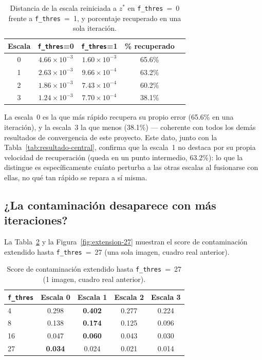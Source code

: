 \documentclass[11pt,a4paper]{article}
\newcommand{\code}[1]{\texttt{#1}}
\begin{document}
\begin{table}[H]
  \centering
  \caption{Distancia de la escala reiniciada a $z^*$ en \code{f\_thres}~=~0 frente a
    \code{f\_thres}~=~1, y porcentaje recuperado en una sola iteración.}
  \label{tab:recuperacion}
  \begin{tabular}{@{}ccccc@{}}
    \toprule
    Escala & \code{f\_thres}=0 & \code{f\_thres}=1 & \% recuperado \\
    \midrule
    0 & $4.66\times10^{-3}$ & $1.60\times10^{-3}$ & 65.6\% \\
    1 & $2.63\times10^{-3}$ & $9.66\times10^{-4}$ & 63.2\% \\
    2 & $1.86\times10^{-3}$ & $7.43\times10^{-4}$ & 60.2\% \\
    3 & $1.24\times10^{-3}$ & $7.70\times10^{-4}$ & 38.1\% \\
    \bottomrule
  \end{tabular}
\end{table}

La escala~0 es la que más rápido recupera su propio error (65.6\% en una iteración), y la escala~3
la que menos (38.1\%) --- coherente con todos los demás resultados de convergencia de este proyecto.
Este dato, junto con la Tabla~\ref{tab:resultado-central}, confirma que la escala~1 no destaca por
su propia velocidad de recuperación (queda en un punto intermedio, 63.2\%): lo que la distingue es
específicamente cuánto perturba a las otras escalas al fusionarse con ellas, no qué tan rápido se
repara a sí misma.

\subsection{¿La contaminación desaparece con más iteraciones?}

La Tabla~\ref{tab:extension-27} y la Figura~\ref{fig:extension-27} muestran el score de
contaminación extendido hasta \code{f\_thres}~=~27 (una sola imagen, cuadro real anterior).

\begin{table}[H]
  \centering
  \caption{Score de contaminación extendido hasta \code{f\_thres}~=~27 (1 imagen, cuadro real
    anterior).}
  \label{tab:extension-27}
  \begin{tabular}{@{}lcccc@{}}
    \toprule
    \code{f\_thres} & Escala 0 & Escala 1 & Escala 2 & Escala 3 \\
    \midrule
    4  & 0.298 & \textbf{0.402} & 0.277 & 0.224 \\
    8  & 0.138 & \textbf{0.174} & 0.125 & 0.096 \\
    16 & 0.047 & \textbf{0.060} & 0.043 & 0.030 \\
    27 & \textbf{0.034} & 0.024 & 0.021 & 0.014 \\
    \bottomrule
  \end{tabular}
\end{table}
\end{document}
